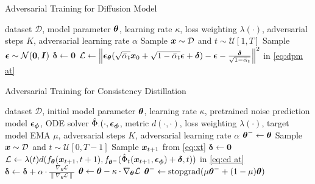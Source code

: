 \begin{algorithm}[t!]
    \caption{Adversarial Training for Diffusion Model}
    \begin{algorithmic}[1]
         dataset $\mathcal{D}$, model parameter $\boldsymbol{\theta}$, learning rate $\kappa$, loss weighting $\lambda(\cdot)$, adversarial steps $K$, adversarial learning rate $\alpha$
            \State Sample $\boldsymbol{x}\sim \mathcal{D}$ and $t\sim \mathcal{U}[1,T]$
            \State Sample $\boldsymbol{\epsilon} \sim \mathcal{N}(\boldsymbol{0}, \boldsymbol{I})$
            \State $\boldsymbol{\delta} \gets \boldsymbol{0}$
                \State $\mathcal{L} \gets \left\|\boldsymbol{\epsilon}_{\boldsymbol{\theta}}(\sqrt{\bar{\alpha}_{t}}\boldsymbol{x}_{0} + \sqrt{1 - \bar{\alpha}_{t}}\boldsymbol{\epsilon} + \boldsymbol{\delta}) - \boldsymbol{\epsilon} - \frac{\boldsymbol{\delta}}{\sqrt{1 - \bar{\alpha}_{t}}}\right\|^{2}$ in \eqref{eq:dpm at}
                 
                     
            \EndFor
        \EndWhile
    \end{algorithmic}
    \label{alg:adv dpm}
\end{algorithm}
\begin{algorithm}[t!]
    \caption{Adversarial Training for Consistency Distillation}\label{alg:adv cm}
    \begin{algorithmic}[1]
         dataset $\mathcal{D}$, initial model parameter $\boldsymbol{\theta}$, learning rate $\kappa$, pretrained noise prediction model $\boldsymbol{\epsilon}_{\boldsymbol{\phi}}$, ODE solver $\hat{\Phi}_{\cdot}(\cdot, \boldsymbol{\epsilon}_{\boldsymbol{\phi}}$, metric $d(\cdot,\cdot)$, loss weighting $\lambda(\cdot)$, target model EMA $\mu$, adversarial steps $K$, adversarial learning rate $\alpha$
        \State $\boldsymbol{\theta}^- \gets \boldsymbol{\theta}$
            \State Sample $\boldsymbol{x}\sim \mathcal{D}$ and $t\sim \mathcal{U}[0,T-1]$
            \State Sample $\boldsymbol{x}_{t + 1}$ from \eqref{eq:xt}
            \State $\boldsymbol{\delta} \gets \boldsymbol{0}$
                \State $\mathcal{L} \gets \lambda(t) d(f_{\boldsymbol{\theta}}(\boldsymbol{x}_{t + 1}, t + 1), f_{\boldsymbol{\theta}^-}(\hat{\Phi}_{t}(\boldsymbol{x}_{t + 1}, \boldsymbol{\epsilon}_{\boldsymbol{\phi}}) + \boldsymbol{\delta}, t))$ in \eqref{eq:cd at}
                \State $\boldsymbol{\delta} \gets \boldsymbol{\delta} + \alpha \cdot \frac{\nabla_{\boldsymbol{\delta}} \mathcal{L}}{\|\nabla_{\boldsymbol{\delta}} \mathcal{L}\|}$ 
                \State $\boldsymbol{\theta} \gets \boldsymbol{\theta} - \kappa \cdot \nabla_{\boldsymbol{\boldsymbol{\theta}}} \mathcal{L}$ 
                \State $\boldsymbol{\theta}^- \gets \text{stopgrad}(\mu \boldsymbol{\theta}^- + (1-\mu)\boldsymbol{\theta})$
            \EndFor
        \EndWhile
    \end{algorithmic}
\end{algorithm}